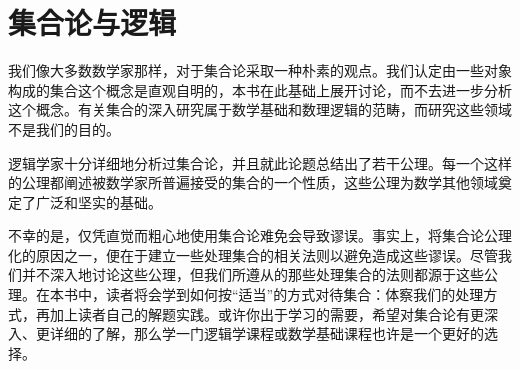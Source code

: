 \documentclass[../main.tex]{subfiles}
\begin{document}
\chapter{集合论与逻辑}\label{chapter:ch01-集合论与逻辑}

我们像大多数数学家那样，对于集合论采取一种朴素的观点。我们认定由一些对象构成的集合这个概念是直观自明的，本书在此基础上展开讨论，而不去进一步分析这个概念。有关集合的深入研究属于数学基础和数理逻辑的范畴，而研究这些领域不是我们的目的。

逻辑学家十分详细地分析过集合论，并且就此论题总结出了若干公理。每一个这样的公理都阐述被数学家所普遍接受的集合的一个性质，这些公理为数学其他领域奠定了广泛和坚实的基础。

不幸的是，仅凭直觉而粗心地使用集合论难免会导致谬误。事实上，将集合论公理化的原因之一，便在于建立一些处理集合的相关法则以避免造成这些谬误。尽管我们并不深入地讨论这些公理，但我们所遵从的那些处理集合的法则都源于这些公理。在本书中，读者将会学到如何按“适当”的方式对待集合：体察我们的处理方式，再加上读者自己的解题实践。或许你出于学习的需要，希望对集合论有更深入、更详细的了解，那么学一门逻辑学课程或数学基础课程也许是一个更好的选择。













\end{document}
